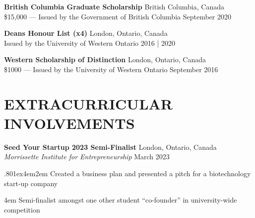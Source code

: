 \documentclass[a4paper,9pt]{extarticle}
\begin{document}
\noindent
\begin{minipage}{1\textwidth}
\setlength{\parindent}{15pt} %
	\noindent
	\textbf{British Columbia Graduate Scholarship}  \hfill British Columbia, Canada\\ 
	\$15,000 --- Issued by the Government of British Columbia \hfill September 2020\\ 
\end{minipage}

\noindent
\begin{minipage}{1\textwidth}
\setlength{\parindent}{15pt} %
	\noindent
	\textbf{Deans Honour List (x4)}  \hfill London, Ontario, Canada\\ 
	Issued by the University of Western Ontario \hfill 2016 | 2020\\ 
\end{minipage}

\noindent
\begin{minipage}{1\textwidth}
\setlength{\parindent}{15pt} %
	\noindent
	\textbf{Western Scholarship of Distinction}  \hfill London, Ontario, Canada\\ 
	\$1000 --- Issued by the University of Western Ontario \hfill September 2016
\end{minipage}

\section*{EXTRACURRICULAR INVOLVEMENTS}
\noindent
\begin{minipage}{1\textwidth}
\setlength{\parindent}{15pt} %
	\noindent
	\textbf{Seed Your Startup 2023 Semi-Finalist} \hfill London, Ontario, Canada\\ %
	\textit{Morrissette Institute for Entrepreneurship} \hfill March 2023  \par%
	{\hsize.80\linewidth\parskip1ex\hangindent4em\parindent2em 
	\setlength{\parskip}{0pt} %
		\indent Created a business plan and presented a pitch for a biotechnology start-up company \par
		\hangindent4em
		\indent Semi-finalist amongst one other student “co-founder” in university-wide competition \par}
\end{minipage}
\vspace{\parskip}
\end{document}
